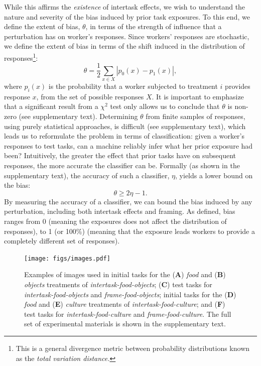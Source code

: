 \documentclass[12pt]{article}
\begin{document}
While this affirms the \textit{existence} of intertask effects, we wish to
understand the nature and severity of the bias induced by prior task 
exposures.  To this end, we define the extent of bias, $\theta$, in terms of
the strength of influence that a perturbation has on worker's responses.
Since workers' responses are stochastic, we define the extent of bias in 
terms of the shift induced in the distribution of responses\footnote{
	This is a general divergence metric between probability 
	distributions known as the \textit{total variation distance.}
}:
\begin{equation}
	\theta = \frac{1}{2}\sum_{x \in X} \left| p_0(x) - p_1(x) \right|,
	\label{eq:theta}
\end{equation}
where $p_i(x)$ is the probability that a worker subjected to treatment $i$
provides response $x$, from the set of possible responses $X$.
It is important to emphasize that a significant result from a $\chi^2$ test 
only allows us to conclude that $\theta$ is non-zero 
(see supplementary text).  
Determining $\theta$ from finite samples of responses, using purely 
statistical approaches, is difficult (see supplementary text),
which leads us to reformulate the
problem in terms of classification: given a worker's 
responses to test tasks, can a machine reliably infer what her prior exposure 
had been?  Intuitively, the greater the effect that prior tasks have on 
subsequent
responses, the more accurate the classifier can be.  Formally (as shown
in the supplementary text), the accuracy of such a classifier, $\eta$,
yields a lower bound on the bias:
\begin{equation}
	\theta \geq 2\eta - 1.
	\label{l1}
\end{equation}
By measuring the accuracy of a classifier, we can bound the 
bias induced by any perturbation, including both intertask effects and 
framing.  As defined, bias ranges from 0 (meaning the exposures 
does not affect the distribution of responses), to 1 
(or 100\%) (meaning that the exposure leads workers to provide a completely
different set of responses).

\begin{figure}
	\centering
	\texttt{[image: figs/images.pdf]}
	\caption{
		Examples of images used in
		initial tasks for the (\textbf{A}) \textit{food} and (\textbf{B}) 
		\textit{objects} treatments of \textit{intertask-food-objects};
		(\textbf{C}) test tasks for \textit{intertask-food-objects} and 
		\textit{frame-food-objects};
		initial tasks for the (\textbf{D}) \textit{food} and (\textbf{E}) 
		\textit{culture} treatments of \textit{intertask-food-culture};
		and (\textbf{F}) test tasks for \textit{intertask-food-culture} and 
		\textit{frame-food-culture}.
		The full set of experimental materials is shown in the 
		supplementary text.
	}

	\label{fig:task}
\end{figure}
\end{document}
